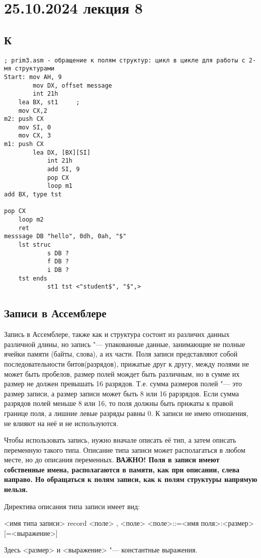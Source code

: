 \section{25.10.2024 лекция 8}
\subsection{К}

\begin{verbatim}
; prim3.asm - обращение к полям структур: цикл в цикле для работы с 2-мя структурами
Start: mov AH, 9
        mov DX, offset message
        int 21h
    lea BX, st1     ;
    mov CX,2
m2: push CX
    mov SI, 0
    mov CX, 3
m1: push CX 
        lea DX, [BX][SI]
            int 21h
            add SI, 9
            pop CX
            loop m1
add BX, type tst

pop CX 
    loop m2
    ret
messsage DB "hello", 0dh, 0ah, "$"
    lst struc  
            s DB ?
            f DB ?
            i DB ?
    tst ends
            st1 tst <"student$", "$",>

\end{verbatim}

\subsection{Записи в Ассемблере}
Запись в Ассемблере, также как и структура состоит из различнх данных различной длины, но запись "--- упакованные данные, занимающие не полные ячейки памяти (байты, слова), а их части. Поля записи представляют собой последовательности битов(разрядов), прижатые друг к другу, между полями не может быть пробелов, размер полей мождет быть различным, но в сумме их размер не должен превышать 16 разрядов. Т.е. сумма размеров полей "--- это размер записи, а размер записи может быть 8 или 16 рарзрядов. Если сумма разрядов полей меньше 8 или 16, то поля должны быть прижаты к правой границе поля, а лишние левые разряды равны 0.  К записи не имею отношения, не влияют на неё и не используются.

Чтобы использовать запись, нужно вначале описать её тип, а затем описать переменную такого типа. Описание типа записи может располагаться в любом месте, но до описания переменных. \textbf{ВАЖНО! Поля в записи имеют собственные имена, располагаются в памяти, как при описании, слева направо. Но обращаться к полям записи, как к полям структуры напрямую нельзя.}

Директива описания типа записи имеет вид:
\begin{center}
    <имя типа записи> record <поле> {, <поле>}
    <поле>::=<имя поля>:<размер>[=<выражение>]
\end{center}
Здесь <размер> и <выражение> "--- константные выражения.

